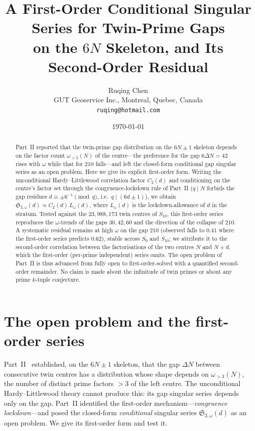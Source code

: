 \documentclass[11pt]{article}
\title{A First-Order Conditional Singular Series for Twin-Prime Gaps\\
on the $6N$ Skeleton, and Its Second-Order Residual}
\author{Ruqing Chen\\
\small GUT Geoservice Inc., Montreal, Quebec, Canada\\
\small \texttt{ruqing@hotmail.com}}
\date{\today}
\begin{document}
\maketitle

\begin{abstract}
Part~II reported that the twin-prime gap distribution on the $6N\pm1$ skeleton
depends on the factor count $\omega_{>3}(N)$ of the centre---the preference for
the gap $6\Delta N=42$ rises with $\omega$ while that for $210$ falls---and left
the closed-form conditional gap singular series as an open problem. Here we give
its explicit first-order form. Writing the unconditional Hardy--Littlewood
correlation factor $C_2(d)$ and conditioning on the centre's factor set through
the congruence-lockdown rule of Part~II ($q\mid N$ forbids the gap residues
$d\equiv\pm6^{-1}\pmod q$, i.e.\ $q\mid(6d\pm1)$), we obtain
$\mathfrak{S}_{2,\omega}(d)\approx C_2(d)\,L_\omega(d)$, where $L_\omega(d)$ is
the lockdown-allowance of $d$ in the stratum. Tested against the
$23{,}988{,}173$ twin centres of $S_{10}$, this first-order series reproduces the
$\omega$-trends of the gaps $30,42,60$ and the direction of the collapse of
$210$. A systematic residual remains at high $\omega$ on the gap $210$ (observed
falls to $0.41$ where the first-order series predicts $0.62$), stable across
$S_9$ and $S_{10}$; we attribute it to the second-order correlation between the
factorisations of the two centres $N$ and $N+d$, which the first-order
(per-prime independent) series omits. The open problem of Part~II is thus
advanced from fully open to first-order-solved with a quantified second-order
remainder. No claim is made about the infinitude of twin primes or about any
prime $k$-tuple conjecture.
\end{abstract}

\section{The open problem and the first-order series}

Part~II~\cite{ChenII} established, on the $6N\pm1$ skeleton, that the gap
$\Delta N$ between consecutive twin centres has a distribution whose shape
depends on $\omega_{>3}(N)$, the number of distinct prime factors $>3$ of the
left centre. The unconditional Hardy--Littlewood theory cannot produce this: its
gap singular series depends only on the gap. Part~II identified the first-order
mechanism---\emph{congruence lockdown}---and posed the closed-form
\emph{conditional} singular series $\mathfrak{S}_{2,\omega}(d)$ as an open
problem. We give its first-order form and test it.
\end{document}
